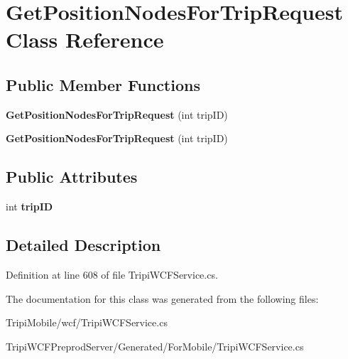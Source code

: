 \hypertarget{class_get_position_nodes_for_trip_request}{
\section{GetPositionNodesForTripRequest Class Reference}
\label{class_get_position_nodes_for_trip_request}
}
\subsection*{Public Member Functions}
\begin{DoxyCompactItemize}
\item 
\hypertarget{class_get_position_nodes_for_trip_request_a546e619c57b83311db754543c83d399b}{
{\bfseries GetPositionNodesForTripRequest} (int tripID)}
\label{class_get_position_nodes_for_trip_request_a546e619c57b83311db754543c83d399b}

\item 
\hypertarget{class_get_position_nodes_for_trip_request_a546e619c57b83311db754543c83d399b}{
{\bfseries GetPositionNodesForTripRequest} (int tripID)}
\label{class_get_position_nodes_for_trip_request_a546e619c57b83311db754543c83d399b}

\end{DoxyCompactItemize}
\subsection*{Public Attributes}
\begin{DoxyCompactItemize}
\item 
\hypertarget{class_get_position_nodes_for_trip_request_ad7a30078fbca6ab57218488657ea6dc8}{
int {\bfseries tripID}}
\label{class_get_position_nodes_for_trip_request_ad7a30078fbca6ab57218488657ea6dc8}

\end{DoxyCompactItemize}


\subsection{Detailed Description}


Definition at line 608 of file TripiWCFService.cs.

The documentation for this class was generated from the following files:\begin{DoxyCompactItemize}
\item 
TripiMobile/wcf/TripiWCFService.cs\item 
TripiWCFPreprodServer/Generated/ForMobile/TripiWCFService.cs\end{DoxyCompactItemize}
